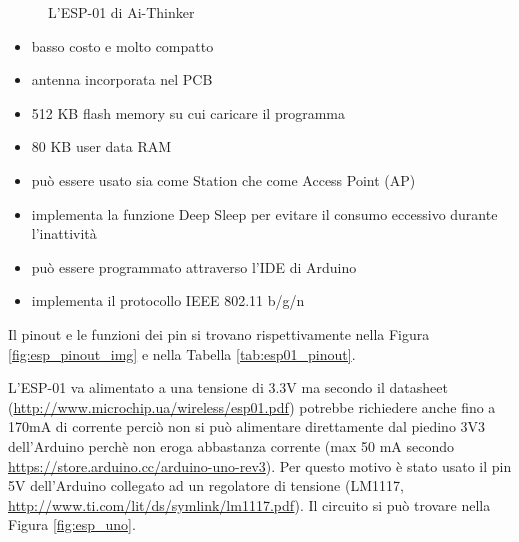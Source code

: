 \documentclass[12pt]{report}
\begin{document}
\begin{figure}
	\caption{L'ESP-01 di Ai-Thinker}
	\label{fig:esp01}
\end{figure}


\begin{itemize}
	\item basso costo e molto compatto
	\item antenna incorporata nel PCB
	\item 512 KB flash memory su cui caricare il programma
	\item 80 KB user data RAM
	\item può essere usato sia come Station che come Access Point (AP)
	\item implementa la funzione Deep Sleep per evitare il consumo eccessivo durante l'inattività
	\item può essere programmato attraverso l'IDE di Arduino
	\item implementa il protocollo IEEE 802.11 b/g/n
\end{itemize}
Il pinout e le funzioni dei pin si trovano rispettivamente nella Figura \ref{fig:esp_pinout_img} e nella Tabella \ref{tab:esp01_pinout}. 

L'ESP-01 va alimentato a una tensione di 3.3V ma secondo il datasheet (\url{http://www.microchip.ua/wireless/esp01.pdf}) potrebbe richiedere anche fino a 170mA di corrente perciò non si può alimentare direttamente dal piedino 3V3 dell'Arduino perchè non eroga abbastanza corrente (max 50 mA secondo \url{https://store.arduino.cc/arduino-uno-rev3}). Per questo motivo è stato usato il pin 5V dell'Arduino collegato ad un regolatore di tensione (LM1117, \url{http://www.ti.com/lit/ds/symlink/lm1117.pdf}). 
Il circuito si può trovare nella Figura \ref{fig:esp_uno}.
\end{document}
